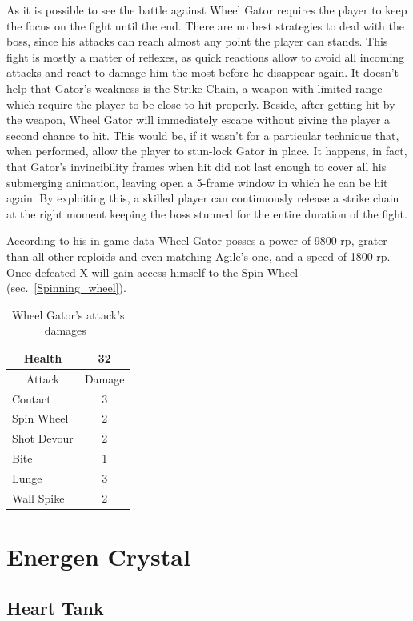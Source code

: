 As it is possible to see the battle against Wheel Gator requires the player to keep the focus on the fight until the end. There are no best strategies to deal with the boss, since his attacks can reach almost any point the player can stands. This fight is mostly a matter of reflexes, as quick reactions allow to avoid all incoming attacks and react to damage him the most before he disappear again. It doesn't help that Gator's weakness is the Strike Chain, a weapon with limited range which require the player to be close to hit properly. Beside, after getting hit by the weapon, Wheel Gator will immediately escape without giving the player a second chance to hit. This would be, if it wasn't for a particular technique that, when performed, allow the player to stun-lock Gator in place. It happens, in fact, that Gator's invincibility frames when hit did not last enough to cover all his submerging animation, leaving open a 5-frame window in which he can be hit again. By exploiting this, a skilled player can continuously release a strike chain at the right moment keeping the boss stunned for the entire duration of the fight.

According to his in-game data Wheel Gator posses a power of 9800 rp, grater than all other reploids and even matching Agile's one, and a speed of 1800 rp. Once defeated X will gain access himself to the Spin Wheel (sec.~\ref{Spinning_wheel}).


\begin{table}[htp]
	\centering
	\begin{tabular}[h]{l c}
		\toprule
		\multicolumn{1}{c}{Health}  & 32 \\
		\midrule
		\multicolumn{1}{c}{Attack} & \multicolumn{1}{c}{Damage}\\
		Contact & 3 \\
		Spin Wheel & 2\\
		Shot Devour & 2\\
		Bite & 1\\
		Lunge& 3\\
		Wall Spike& 2\\
		\bottomrule
	\end{tabular}
	\caption{Wheel Gator's attack's damages~\cite{wiki:Wheel_gator}}
\end{table}

\section{Energen Crystal}

\subsection{Heart Tank}

